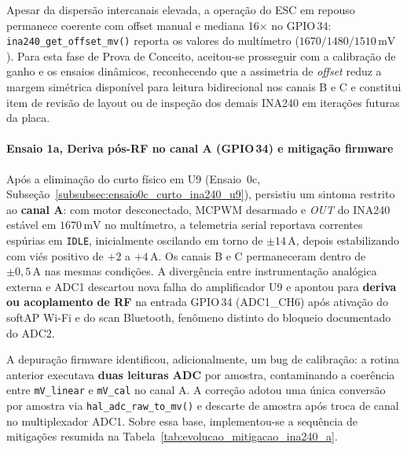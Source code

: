 Apesar da dispersão intercanais elevada, a operação do ESC em repouso permanece coerente com offset manual e mediana 16× no GPIO\,34: \texttt{ina240\_get\_offset\_mv()} reporta os valores do multímetro ($1670/1480/1510\,\text{mV}$). Para esta fase de Prova de Conceito, aceitou-se prosseguir com a calibração de ganho e os ensaios dinâmicos, reconhecendo que a assimetria de \textit{offset} reduz a margem simétrica disponível para leitura bidirecional nos canais B e C e constitui item de revisão de layout ou de inspeção dos demais INA240 em iterações futuras da placa.

\paragraph{\texorpdfstring{Ensaio 1a, Deriva pós-RF no canal A (GPIO\,34) e mitigação firmware}{Ensaio 1a, Deriva pós-RF no canal A (GPIO 34) e mitigação firmware}}
\label{par:ensaio1a_deriva_gpio34}

Após a eliminação do curto físico em U9 (Ensaio~0c, Subseção~\ref{subsubsec:ensaio0c_curto_ina240_u9}), persistiu um sintoma restrito ao \textbf{canal A}: com motor desconectado, MCPWM desarmado e \textit{OUT} do INA240 estável em $1670\,\text{mV}$ no multímetro, a telemetria serial reportava correntes espúrias em \texttt{IDLE}, inicialmente oscilando em torno de $\pm 14\,\text{A}$, depois estabilizando com viés positivo de $+2$ a $+4\,\text{A}$. Os canais B e C permaneceram dentro de $\pm 0{,}5\,\text{A}$ nas mesmas condições. A divergência entre instrumentação analógica externa e ADC1 descartou nova falha do amplificador U9 e apontou para \textbf{deriva ou acoplamento de RF} na entrada GPIO\,34 (ADC1\_CH6) após ativação do softAP Wi-Fi e do scan Bluetooth, fenômeno distinto do bloqueio documentado do ADC2.

A depuração firmware identificou, adicionalmente, um bug de calibração: a rotina anterior executava \textbf{duas leituras ADC} por amostra, contaminando a coerência entre \texttt{mV\_linear} e \texttt{mV\_cal} no canal A. A correção adotou uma única conversão por amostra via \texttt{hal\_adc\_raw\_to\_mv()} e descarte de amostra após troca de canal no multiplexador ADC1. Sobre essa base, implementou-se a sequência de mitigações resumida na Tabela~\ref{tab:evolucao_mitigacao_ina240_a}.

